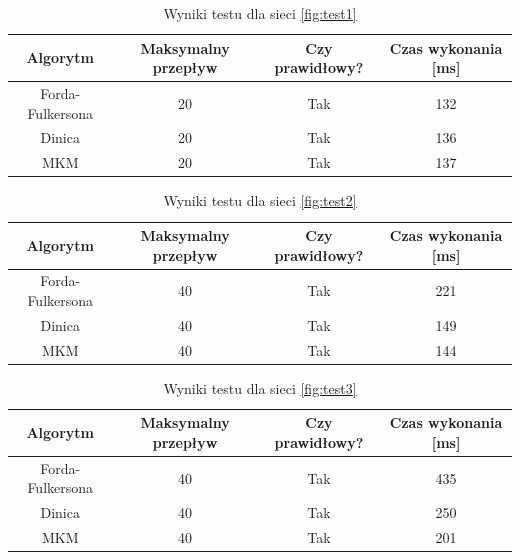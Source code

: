 \begin{table}
	\centering
	\begin{tabular}{|c|c|c|c|}\hline
		\textbf{Algorytm} & \textbf{Maksymalny przepływ} & \textbf{Czy prawidłowy?} & \textbf{Czas wykonania} [ms] \\[1pt]\hline
		Forda-Fulkersona        &     20                &    Tak             &      132          \\[1pt]
		Dinica        &       20              &      Tak           &     136           \\[1pt]
		MKM        &      20               &       Tak          &        137        \\\hline
	\end{tabular}
	\caption{Wyniki testu dla sieci \ref{fig:test1}}
	\label{table:test1}
\end{table}
\begin{table}
	\centering
	\begin{tabular}{|c|c|c|c|}\hline
		\textbf{Algorytm} & \textbf{Maksymalny przepływ} & \textbf{Czy prawidłowy?} & \textbf{Czas wykonania} [ms] \\[1pt]\hline
		Forda-Fulkersona        &     40                &    Tak             &      221          \\[1pt]
		Dinica        &       40              &      Tak           &     149           \\[1pt]
		MKM        &      40               &       Tak          &        144        \\\hline
	\end{tabular}
	\caption{Wyniki testu dla sieci \ref{fig:test2}}
	\label{table:test2}
\end{table}
\begin{table}
	\centering
	\begin{tabular}{|c|c|c|c|}\hline
		\textbf{Algorytm} & \textbf{Maksymalny przepływ} & \textbf{Czy prawidłowy?} & \textbf{Czas wykonania} [ms] \\[1pt]\hline
		Forda-Fulkersona        &     40                &    Tak             &      435          \\[1pt]
		Dinica        &       40              &      Tak           &     250           \\[1pt]
		MKM        &      40               &       Tak          &        201        \\\hline
	\end{tabular}
	\caption{Wyniki testu dla sieci \ref{fig:test3}}
	\label{table:test3}
\end{table}